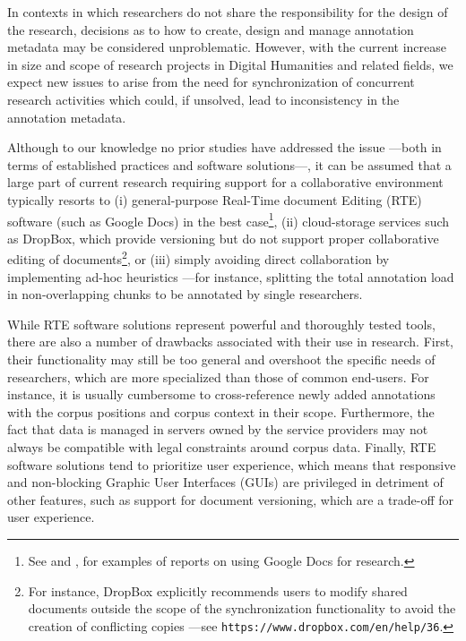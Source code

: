 \documentclass{sig-alternate}
\begin{document}
In contexts in which researchers do not share the responsibility for the design of the research,
decisions as to how to create, design and manage annotation metadata may be considered unproblematic.
However, with the current increase in size and scope of research projects in Digital Humanities and
related fields, we expect new issues to arise from the need for synchronization of concurrent
research activities which could, if unsolved, lead to inconsistency in the annotation metadata.

Although to our knowledge no prior studies have addressed the issue ---both in terms of
established practices and software solutions---,
it can be assumed that a large part of current research requiring support for a
collaborative environment typically resorts to (i) general-purpose Real-Time document Editing
(RTE) software (such as Google Docs) in the best case\footnote{
  See \cite{Rowlands2011} and \cite{Wood2011}, for examples of reports on using Google Docs
  for research.
}, (ii) cloud-storage services such as DropBox, which provide versioning but do
not support proper collaborative editing of documents\footnote{
  For instance, DropBox explicitly recommends users to modify shared documents outside the scope
  of the synchronization functionality to avoid the creation of conflicting copies ---see
  \texttt{https://www.dropbox.com/en/help/36}.
}, or (iii) simply avoiding direct collaboration by implementing ad-hoc heuristics ---for
instance, splitting the total annotation load in non-overlapping chunks to be annotated by
single researchers.

While RTE software solutions represent powerful and thoroughly tested tools, there are also
a number of drawbacks associated with their use in research.
First, their functionality may still be too general and overshoot the specific needs of
researchers, which are more specialized than those of common end-users. For instance, it is usually
cumbersome to cross-reference newly added annotations with the corpus positions and corpus
context in their scope.
Furthermore, the fact that data is managed in servers owned by the service providers may not
always be compatible with legal constraints around corpus data.
Finally, RTE software solutions tend to prioritize user experience, which means that
responsive and non-blocking Graphic User Interfaces (GUIs) are privileged in detriment of
other features, such as support for document versioning, which are a trade-off for
user experience.
\end{document}
